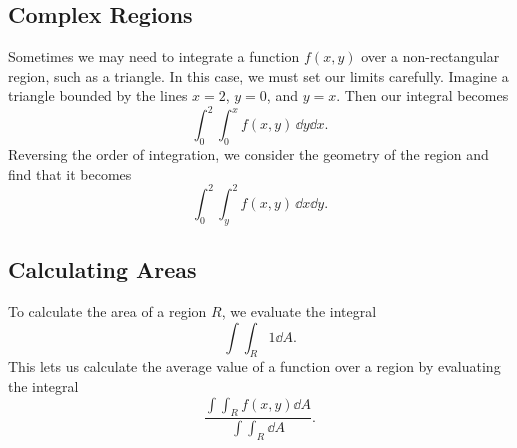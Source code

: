 \documentclass[12pt]{article}
\theoremstyle{plain} %
\theoremstyle{definition}
\theoremstyle{definition}
\theoremstyle{definition}
\theoremstyle{remark}
\begin{document}
\subsection{Complex Regions}
Sometimes we may need to integrate a function $f(x,y)$ over a non-rectangular region, such as a triangle. In this case, we must set our limits carefully. Imagine a triangle bounded by the lines $x=2$, $y=0$, and $y=x$. Then our integral becomes
\[ \int_0^2 \int_0^x f(x,y) \, \dd{y} \dd{x}.\]
Reversing the order of integration, we consider the geometry of the region and find that it becomes
\[ \int_0^2 \int_y^2 f(x,y) \, \dd{x} \dd{y}.\]

\subsection{Calculating Areas}
To calculate the area of a region $R$, we evaluate the integral
\[ \int \int_R 1 \dd{A} .\]
This lets us calculate the average value of a function over a region by evaluating the integral
    \[ \frac{\int \int_R f(x,y) \dd{A}}{\int \int_R \dd{A}} .\]
\end{document}
